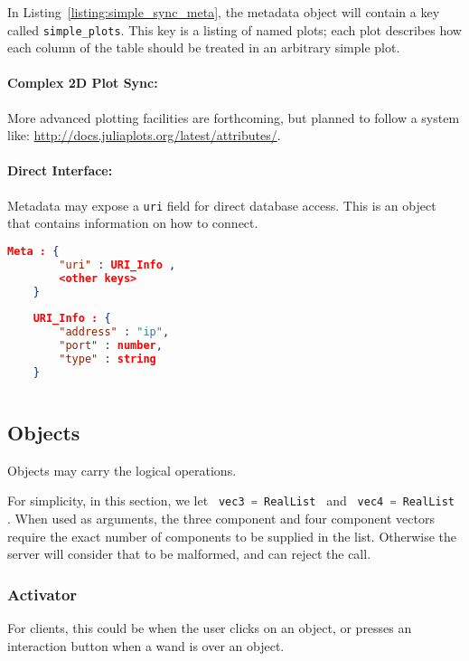 \documentclass[11pt, oneside]{amsart}
\begin{document}
In Listing~\ref{listing:simple_sync_meta}, the metadata object will contain a key called \texttt{simple\_plots}. This key is a listing of named plots; each plot describes how each column of the table should be treated in an arbitrary simple plot.

\paragraph{Complex 2D Plot Sync:} More advanced plotting facilities are forthcoming, but planned to follow a system like:
\url{http://docs.juliaplots.org/latest/attributes/}.

\paragraph{Direct Interface:} Metadata may expose a \texttt{uri} field for direct database access. This is an object that contains information on how to connect.

\begin{lstlisting}[language=json, label=listing:simple_db_meta, caption=Table URI Field ]
	Meta : {
		"uri" : URI_Info ,
		<other keys>
	}
	
	URI_Info : { 
		"address" : "ip",
		"port" : number,
		"type" : string 
	}
	
\end{lstlisting}


\subsection{Objects}
\label{sec:obj_cap}

Objects may carry the logical operations. 

For simplicity, in this section, we let \lstinline[language=c++]| vec3 = RealList | and \lstinline[language=c++]| vec4 = RealList |. When used as arguments, the three component and four component vectors require the exact number of components to be supplied in the list. Otherwise the server will consider that to be malformed, and can reject the call.

\subsubsection{Activator}

For clients, this could be when the user clicks on an object, or presses an interaction button when a wand is over an object.


\end{document}
